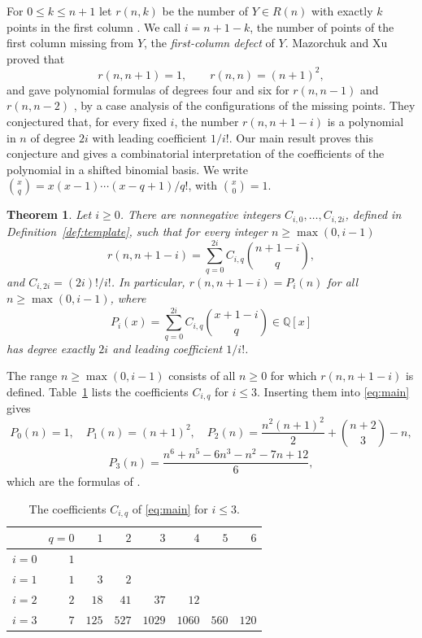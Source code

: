 \documentclass[11pt]{amsart}
\newtheorem{theorem}{Theorem}[section]
\theoremstyle{definition}
\theoremstyle{remark}
\numberwithin{equation}{section}
\newcommand{\Q}{\mathbb{Q}}
\begin{document}
For $0\le k\le n+1$ let $r(n,k)$ be the number of $Y\in R(n)$ with exactly $k$ points in the first column \cite[Section~5.1]{MX}. We call $i=n+1-k$, the number of points of the first column missing from $Y$, the \emph{first-column defect} of $Y$. Mazorchuk and Xu proved that
\[
r(n,n+1)=1,\qquad r(n,n)=(n+1)^2,
\]
and gave polynomial formulas of degrees four and six for $r(n,n-1)$ and $r(n,n-2)$ \cite[Propositions~11--14]{MX}, by a case analysis of the configurations of the missing points. They conjectured \cite[Section~5.7]{MX} that, for every fixed $i$, the number $r(n,n+1-i)$ is a polynomial in $n$ of degree $2i$ with leading coefficient $1/i!$. Our main result proves this conjecture and gives a combinatorial interpretation of the coefficients of the polynomial in a shifted binomial basis. We write $\binom{x}{q}=x(x-1)\cdots(x-q+1)/q!$, with $\binom{x}{0}=1$.

\begin{theorem}\label{thm:main}
Let $i\ge0$. There are nonnegative integers $C_{i,0},\dots,C_{i,2i}$, defined in Definition~\ref{def:template}, such that for every integer $n\ge\max(0,i-1)$
\begin{equation}\label{eq:main}
r(n,n+1-i)=\sum_{q=0}^{2i}C_{i,q}\binom{n+1-i}{q},
\end{equation}
and $C_{i,2i}=(2i)!/i!$. In particular, $r(n,n+1-i)=P_i(n)$ for all $n\ge\max(0,i-1)$, where
\[
P_i(x)=\sum_{q=0}^{2i}C_{i,q}\binom{x+1-i}{q}\in\Q[x]
\]
has degree exactly $2i$ and leading coefficient $1/i!$.
\end{theorem}

The range $n\ge\max(0,i-1)$ consists of all $n\ge0$ for which $r(n,n+1-i)$ is defined. Table~\ref{tab:C} lists the coefficients $C_{i,q}$ for $i\le3$. Inserting them into \eqref{eq:main} gives
\[
P_0(n)=1,\quad P_1(n)=(n+1)^2,\quad P_2(n)=\frac{n^2(n+1)^2}{2}+\binom{n+2}{3}-n,
\]
\[
P_3(n)=\frac{n^6+n^5-6n^3-n^2-7n+12}{6},
\]
which are the formulas of \cite[Propositions~11--14]{MX}.

\begin{table}[ht]
\caption{The coefficients $C_{i,q}$ of \eqref{eq:main} for $i\le3$.}\label{tab:C}
\centering
\begin{tabular}{@{}lrrrrrrr@{}}
\toprule
 & $q=0$ & $1$ & $2$ & $3$ & $4$ & $5$ & $6$\\
\midrule
$i=0$ & $1$ & & & & & & \\
$i=1$ & $1$ & $3$ & $2$ & & & & \\
$i=2$ & $2$ & $18$ & $41$ & $37$ & $12$ & & \\
$i=3$ & $7$ & $125$ & $527$ & $1029$ & $1060$ & $560$ & $120$\\
\bottomrule
\end{tabular}
\end{table}
\end{document}
